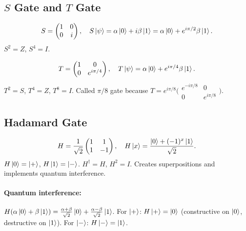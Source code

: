 \documentclass[10pt,a4paper]{article}
\begin{document}
\subsection{$S$ Gate and $T$ Gate}

\begin{tcolorbox}[defstyle, title={Definition: $S$ (Phase) Gate}]
\[
S = \begin{pmatrix}1&0\\0&i\end{pmatrix},\quad S\ket{\psi}=\alpha\ket{0}+i\beta\ket{1}=\alpha\ket{0}+e^{i\pi/2}\beta\ket{1}.
\]
$S^2=Z$, $S^4=I$.
\end{tcolorbox}

\begin{tcolorbox}[defstyle, title={Definition: $T$ ($\pi/8$) Gate}]
\[
T = \begin{pmatrix}1&0\\0&e^{i\pi/4}\end{pmatrix},\quad T\ket{\psi}=\alpha\ket{0}+e^{i\pi/4}\beta\ket{1}.
\]
$T^2=S$, $T^4=Z$, $T^8=I$. Called $\pi/8$ gate because $T=e^{i\pi/8}\bigl(\begin{smallmatrix}e^{-i\pi/8}&0\\0&e^{i\pi/8}\end{smallmatrix}\bigr)$.
\end{tcolorbox}

\subsection{Hadamard Gate}

\begin{tcolorbox}[defstyle, title={Definition: Hadamard Gate}]
\[
H = \frac{1}{\sqrt{2}}\begin{pmatrix}1&1\\1&-1\end{pmatrix},\quad H\ket{x}=\frac{\ket{0}+(-1)^x\ket{1}}{\sqrt{2}}.
\]
$H\ket{0}=\ket{+}$, $H\ket{1}=\ket{-}$. $H^\dagger=H$, $H^2=I$. Creates superpositions and implements quantum interference.
\end{tcolorbox}

\paragraph{Quantum interference:} $H(\alpha\ket{0}+\beta\ket{1})=\frac{\alpha+\beta}{\sqrt{2}}\ket{0}+\frac{\alpha-\beta}{\sqrt{2}}\ket{1}$. For $\ket{+}$: $H\ket{+}=\ket{0}$ (constructive on $\ket{0}$, destructive on $\ket{1}$). For $\ket{-}$: $H\ket{-}=\ket{1}$.
\end{document}
